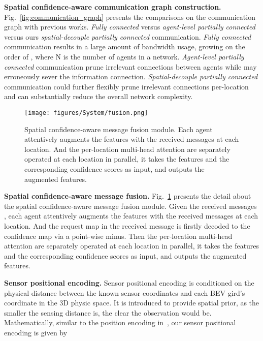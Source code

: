 \documentclass{article}
\begin{document}
\textbf{Spatial confidence-aware communication graph construction.} Fig.~\ref{fig:communication_graph} presents the comparisons on the communication graph with previous works. \textit{Fully connected} versus \textit{agent-level partially connected} versus ours \textit{spatial-decouple partially connected} communication. \textit{Fully connected} communication results in a large amount of bandwidth usage, growing on the order of , where N is the number of agents in a network. \textit{Agent-level partially connected} communication prune irrelevant connections between agents while may erroneously sever the information connection. \textit{Spatial-decouple partially connected} communication could further flexibly prune irrelevant connections per-location and can substantially reduce the overall network complexity.



\begin{figure}
    \centering
\texttt{[image: figures/System/fusion.png]}
    \caption{Spatial confidence-aware message fusion module. Each agent attentively augments the features with the received messages at each location. And the per-location multi-head attention are separately operated at each location in parallel, it takes the features and the corresponding confidence scores as input, and outputs the augmented features.}
    \label{fig:fusion}
\end{figure}

\textbf{Spatial confidence-aware message fusion.} Fig.~\ref{fig:fusion} presents the detail about the spatial confidence-aware message fusion module. Given the received messages , each agent  attentively augments the features with the received messages at each location. And the request map  in the received message is firstly decoded to the confidence map  via a point-wise minus. Then the per-location multi-head attention are separately operated at each location in parallel, it takes the features and the corresponding confidence scores as input, and outputs the augmented features. 

\textbf{Sensor positional encoding.} Sensor positional encoding is conditioned on the physical distance between the known sensor coordinates and each BEV gird's coordinate in the 3D physic space. It is introduced to provide spatial prior, as the smaller the sensing distance is, the clear the observation would be. Mathematically, similar to the position encoding in~\cite{vaswani2017attention}, our sensor positional encoding is given by 
\end{document}
